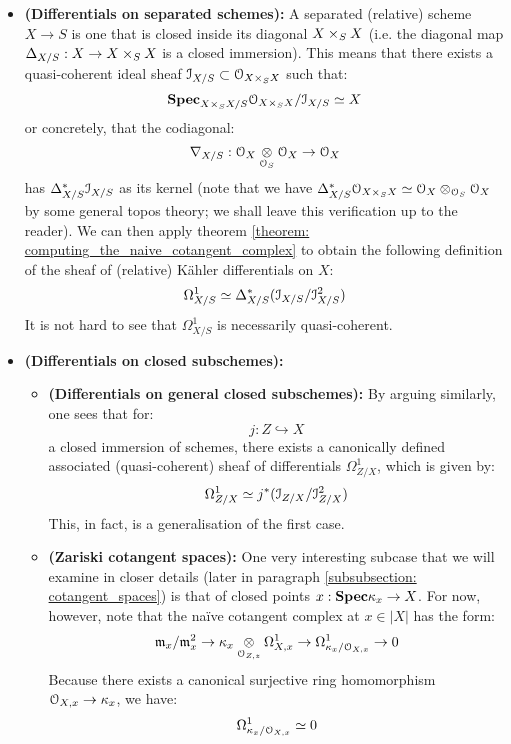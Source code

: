                 \begin{corollary} \label{coro: naive_cotangent_complex_of_separated_schemes_and_closed_subschemes}
                    \noindent
                    \begin{itemize}
                        \item \textbf{(Differentials on separated schemes):} A separated (relative) scheme $X \to S$ is one that is closed inside its diagonal $X \x_S X$ (i.e. the diagonal map $\Delta_{X/S}: X \to X \x_S X$ is a closed immersion). This means that there exists a quasi-coherent ideal sheaf $\calI_{X/S} \subset \calO_{X \x_S X}$ such that:
                        $$\Spec_{X \x_S X/S} \calO_{X \x_S X}/\calI_{X/S} \cong X$$
                        or concretely, that the codiagonal:
                            $$\nabla_{X/S}: \calO_X \tensor_{\calO_S} \calO_X \to \calO_X$$
                        has $\Delta^*_{X/S} \mathcal{I}_{X/S}$ as its kernel (note that we have $\Delta^*_{X/S} \calO_{X \x_S X} \cong \calO_X \tensor_{\calO_S} \calO_X$ by some general topos theory; we shall leave this verification up to the reader). We can then apply theorem \ref{theorem: computing_the_naive_cotangent_complex} to obtain the following definition of the sheaf of (relative) K\"ahler differentials on $X$:
                            $$\Omega^1_{X/S} \simeq \Delta^*_{X/S}(\mathcal{I}_{X/S}/\mathcal{I}_{X/S}^2)$$
                        It is not hard to see that $\Omega^1_{X/S}$ is necessarily quasi-coherent.
                        \item \textbf{(Differentials on closed subschemes):}
                            \begin{itemize}
                                \item \textbf{(Differentials on general closed subschemes):} By arguing similarly, one sees that for:
                                    $$j: Z \hookrightarrow X$$
                                a closed immersion of schemes, there exists a canonically defined associated (quasi-coherent) sheaf of differentials $\Omega^1_{Z/X}$, which is given by:
                                    $$\Omega^1_{Z/X} \simeq j^*(\mathcal{I}_{Z/X}/\mathcal{I}_{Z/X}^2)$$
                                This, in fact, is a generalisation of the first case.
                                \item \textbf{(Zariski cotangent spaces):} One very interesting subcase that we will examine in closer details (later in paragraph \ref{subsubsection: cotangent_spaces}) is that of closed points $x: \mathbf{Spec} \kappa_x \to X$. For now, however, note that the na\"ive cotangent complex at $x \in |X|$ has the form:
                                    $$\m_x/\m_x^2 \to \kappa_x \tensor_{\calO_{Z, z}} \Omega^1_{X, x} \to \Omega^1_{\kappa_x/\calO_{X, x}} \to 0$$
                                Because there exists a canonical surjective ring homomorphism $\mathcal{O}_{X, x} \to \kappa_x$, we have:
                                    $$\Omega^1_{\kappa_x/\mathcal{O}_{X, x}} \simeq 0$$
                            \end{itemize}
                    \end{itemize}
                \end{corollary}
